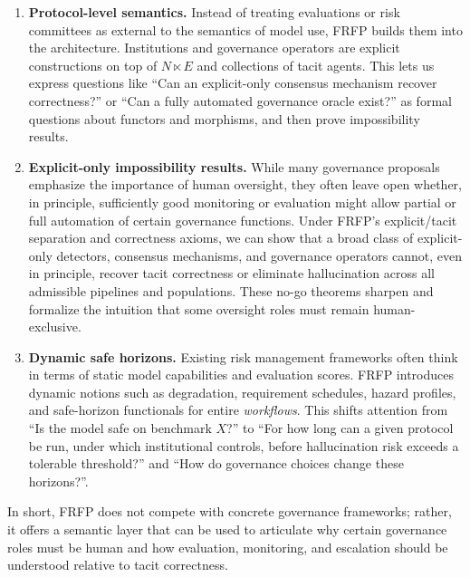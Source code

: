 \documentclass[11pt]{article}
\theoremstyle{definition}
\begin{document}
\begin{enumerate}
  \item \textbf{Protocol-level semantics.}
  Instead of treating evaluations or risk committees as external to the semantics of model use, FRFP builds them into the architecture. Institutions and governance operators are explicit constructions on top of $N \ltimes E$ and collections of tacit agents. This lets us express questions like ``Can an explicit-only consensus mechanism recover correctness?'' or ``Can a fully automated governance oracle exist?'' as formal questions about functors and morphisms, and then prove impossibility results.

  \item \textbf{Explicit-only impossibility results.}
  While many governance proposals emphasize the importance of human oversight, they often leave open whether, in principle, sufficiently good monitoring or evaluation might allow partial or full automation of certain governance functions. Under FRFP’s explicit/tacit separation and correctness axioms, we can show that a broad class of explicit-only detectors, consensus mechanisms, and governance operators cannot, even in principle, recover tacit correctness or eliminate hallucination across all admissible pipelines and populations. These no-go theorems sharpen and formalize the intuition that some oversight roles must remain human-exclusive.

  \item \textbf{Dynamic safe horizons.}
  Existing risk management frameworks often think in terms of static model capabilities and evaluation scores. FRFP introduces dynamic notions such as degradation, requirement schedules, hazard profiles, and safe-horizon functionals for entire \emph{workflows}. This shifts attention from ``Is the model safe on benchmark $X$?'' to ``For how long can a given protocol be run, under which institutional controls, before hallucination risk exceeds a tolerable threshold?'' and ``How do governance choices change these horizons?''.
\end{enumerate}

In short, FRFP does not compete with concrete governance frameworks; rather, it offers a semantic layer that can be used to articulate why certain governance roles must be human and how evaluation, monitoring, and escalation should be understood relative to tacit correctness.
\end{document}
